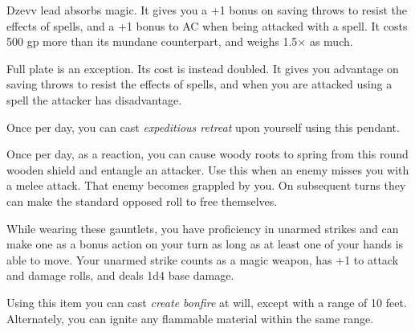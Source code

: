 Dzevv lead absorbs magic.
It gives you a +1 bonus on saving throws to resist the effects of spells, and a +1 bonus to AC when being attacked with a spell.
It costs 500 gp more than its mundane counterpart, and weighs 1.5$\times$ as much.

Full plate is an exception.
Its cost is instead doubled.
It gives you advantage on saving throws to resist the effects of spells, and when you are attacked using a spell the attacker has disadvantage.

Once per day, you can cast \textit{expeditious retreat} upon yourself using this pendant.

Once per day, as a reaction, you can cause woody roots to spring from this round wooden shield and entangle an attacker.
Use this when an enemy misses you with a melee attack.
That enemy becomes grappled by you.
On subsequent turns they can make the standard opposed roll to free themselves.

While wearing these gauntlets, you have proficiency in unarmed strikes and can make one as a bonus action on your turn as long as at least one of your hands is able to move.
Your unarmed strike counts as a magic weapon, has +1 to attack and damage rolls, and deals 1d4 base damage.

Using this item you can cast \textit{create bonfire} at will, except with a range of 10 feet.
Alternately, you can ignite any flammable material within the same range.
